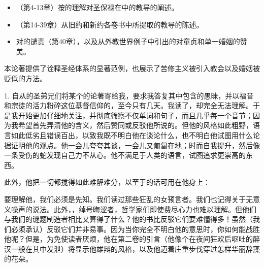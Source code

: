 \begin{itemize}
\item （第4-13章）按的理解对圣保禄在中的教导的阐述。
\end{itemize}

\begin{itemize}
\item （第14-39章）从旧约和新约各卷书中所提取的教导的陈述。
\end{itemize}

\begin{itemize}
\item 对的谴责（第40章），以及从外教世界例子中引出的对童贞和单一婚姻的赞美。
\end{itemize}

本论著提供了诠释圣经体系的显著范例，也展示了苦修主义被引入教会以及婚姻被贬低的方法。\par

1. 自从的圣弟兄们将某个的论著寄给我，要求我答复其中包含的愚昧，并以福音和宗徒的活力粉碎这位基督信仰的，至今只有几天。我读了，却完全无法理解。于是我开始更加仔细地关注，并彻底筛察不仅单词和句子，而且几乎每一个音节；因为我希望首先弄清他的含义，然后赞同或反驳他所说的。但他的风格如此粗野，语言如此低劣且错误百出，以致我既不明白他在谈论什么，也不明白他试图用什么论据证明他的观点。他一会儿夸夸其谈，一会儿又匍匐在地；时而自我提升，然后像一条受伤的蛇发现自己力不从心。他不满足于人类的语言，试图追求更崇高的东西。\par

\newline{}\par

此外，他把一切都搅得如此难解难分，以至于的话可用在他身上：——\par

要理解他，我们必须是先知。我们读过那些狂乱的女预言者。我们也记得关于无意义噪声的说法。此外，，绰号晦涩者，哲学家们即使费尽心力也难以理解。但他们与我们的谜题制造者相比又算得了什么？他的书比反驳它们要难懂得多！虽然（我们必须承认）反驳它们并非易事。因为当你完全不明白他的意思时，你如何能战胜他呢？但是，为免使读者厌烦，他在第二卷的引言（他像个在夜间狂欢后呕吐的醉汉一般在其中发泄）将显示他雄辩的风格，以及他迈着庄重步伐穿过怎样华丽辞藻的花朵。\par

